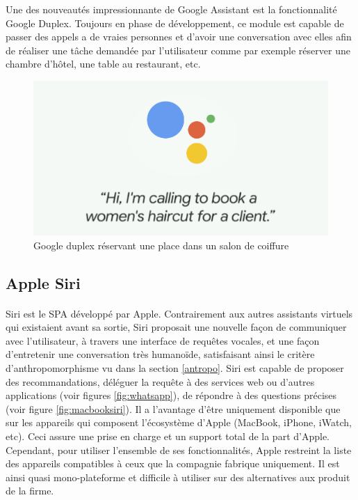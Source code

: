 \par Une des nouveautés impressionnante de Google Assistant est la fonctionnalité Google Duplex. Toujours en phase de développement, ce module est capable de passer des appels a de vraies personnes et d'avoir une conversation avec elles afin de réaliser une tâche demandée par l'utilisateur comme par exemple réserver une chambre d'hôtel, une table au restaurant, etc. 
\begin{figure}[H]
	\centering
	\includegraphics[width=.5\linewidth]{images/google_assitant/duplex.png} 
	\caption{Google duplex réservant une place dans un salon de coiffure} 
\end{figure}


\subsection{Apple Siri}\label{siri}
\paragraph{}
Siri est le SPA développé par Apple. Contrairement aux autres assistants virtuels qui existaient avant sa sortie, Siri proposait une nouvelle façon de communiquer avec l'utilisateur, à travers une interface de requêtes vocales, et une façon d'entretenir une conversation très humanoïde, satisfaisant ainsi le critère d'anthropomorphisme vu dans la section \ref{antropo}.
Siri est capable de proposer des recommandations, déléguer la requête à des services web ou d'autres applications (voir figures \ref{fig:whatsapp}), de répondre à des questions précises (voir figure \ref{fig:macbooksiri}). Il a l'avantage d'être uniquement disponible que sur les appareils qui composent l'écosystème d'Apple (MacBook, iPhone, iWatch, etc). Ceci assure une prise en charge et un support total de la part d'Apple. Cependant, pour utiliser l'ensemble de ses fonctionnalités, Apple restreint la liste des appareils compatibles à ceux que la compagnie fabrique uniquement. Il est ainsi quasi mono-plateforme et difficile à utiliser sur des alternatives aux produit de la firme.

